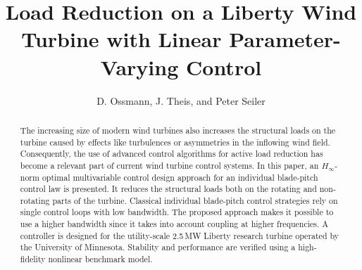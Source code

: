 \documentclass[times]{weauth}
\begin{document}
 



\title{ Load Reduction on a Liberty Wind Turbine with Linear Parameter-Varying Control }

\author{D. Ossmann, J. Theis, and Peter Seiler}

\address{ Aerospace Engineering and Mechanics, University of Minnesota, USA \\
		 \affilnum{2} Institute of Control Systems, Hamburg University of Technology, Germany}



\begin{abstract}
		The increasing size of modern wind turbines also increases the structural
		loads on the turbine caused by effects like turbulences or asymmetries in
		the inflowing wind field. Consequently, the use of advanced control algorithms
		for active load reduction has become a relevant part of current wind turbine
		control systems. In this paper, an $H_\infty$-norm optimal multivariable
		control design approach for an individual blade-pitch control law is presented.
		It reduces the structural loads both on the rotating and non-rotating parts of
		the turbine. Classical individual blade-pitch control
		strategies rely on single control loops with low bandwidth. The proposed
		approach makes it possible to use a higher bandwidth since it takes
		into account coupling at higher frequencies. A controller is
		designed for the utility-scale 2.5\,MW Liberty research turbine
		operated by the University of Minnesota. Stability and performance are verified using
		a high-fidelity nonlinear benchmark model.
\end{abstract}


\maketitle

 
\end{document}
